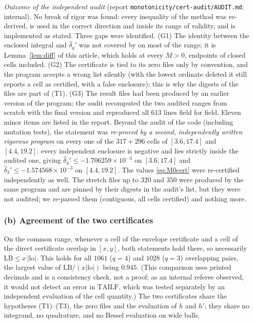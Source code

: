 \documentclass[11pt]{amsart}
\theoremstyle{definition}
\numberwithin{equation}{section}
\newcommand{\hd}{\widehat\delta}
\begin{document}
\emph{Outcome of the independent audit} (report
\texttt{monotonicity/cert-audit/AUDIT.md}; internal). No break of
rigor was found: every inequality of the method was re-derived, is
used in the correct direction and inside its range of validity, and is
implemented as stated. Three gaps were identified. (G1) The identity
between the enclosed integral and $\hd_q'$ was not covered by
\cite[Lemma~21]{WR} on most of the range; it is Lemma~\ref{lem:diff}
of this article, which holds at every $M>0$, endpoints of closed cells
included. (G2) The certificate is tied to its zero files only by
convention, and the program accepts a wrong list silently (with the
lowest ordinate deleted it still reports a cell as certified, with a
false enclosure); this is why the digests of the files are part of
(T1). (G3) The result files had been produced by an earlier version of
the program; the audit recomputed the two audited ranges from scratch
with the final version and reproduced all $613$ lines field for field.
Eleven minor items are listed in the report. Beyond the audit of the
code (including mutation tests), the statement was \emph{re-proved by a
second, independently written rigorous program} on every one of the
$317+296$ cells of $[3.6,17.4]$ and $[4.4,19.2]$: every independent
enclosure is negative and lies strictly inside the audited one, giving
$\hd_4'\le-1.706259\times10^{-3}$ on $[3.6,17.4]$ and
$\hd_3'\le-1.574568\times10^{-3}$ on $[4.4,19.2]$. The values
\eqref{eq:M0cert} were re-certified independently as well. The
stretch files up to $320$ and $350$ were produced by the same program
and are pinned by their digests in the audit's list, but they were not
audited; we re-parsed them (contiguous, all cells certified) and
nothing more.

\subsubsection*{(b) Agreement of the two certificates}
On the common range, whenever a cell of the envelope certificate and a
cell of the direct certificate overlap in $[x,y]$, both statements
hold there, so necessarily $\mathrm{LB}\le x\,|\mathrm{lo}|$. This
holds for all $1061$ ($q=4$) and $1028$ ($q=3$) overlapping pairs, the
largest value of $\mathrm{LB}/(x|\mathrm{lo}|)$ being $0.945$. (This
comparison uses printed decimals and is a consistency check, not a
proof; as an internal referee observed, it would not detect an error
in $\mathrm{TAILF}$, which was tested separately by an independent
evaluation of the cell quantity.) The two certificates share the
hypotheses (T1)--(T3), the zero files and the evaluation of $h$ and
$h'$; they share no integrand, no quadrature, and no Bessel evaluation
on wide balls.
\end{document}
